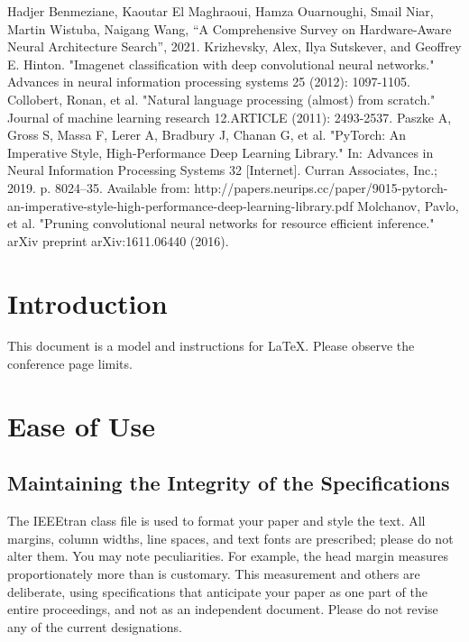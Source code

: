 \documentclass[conference]{IEEEtran}
\begin{document}
\begin{thebibliography}{00}
 Hadjer Benmeziane, Kaoutar El Maghraoui, Hamza Ouarnoughi, Smail Niar, Martin Wistuba, Naigang Wang, ``A Comprehensive Survey on Hardware-Aware Neural Architecture Search'', 2021.
 Krizhevsky, Alex, Ilya Sutskever, and Geoffrey E. Hinton. "Imagenet classification with deep convolutional neural networks." Advances in neural information processing systems 25 (2012): 1097-1105.
 Collobert, Ronan, et al. "Natural language processing (almost) from scratch." Journal of machine learning research 12.ARTICLE (2011): 2493-2537.
 Paszke A, Gross S, Massa F, Lerer A, Bradbury J, Chanan G, et al. "PyTorch: An Imperative Style, High-Performance Deep Learning Library." In: Advances in Neural Information Processing Systems 32 [Internet]. Curran Associates, Inc.; 2019. p. 8024–35. Available from: http://papers.neurips.cc/paper/9015-pytorch-an-imperative-style-high-performance-deep-learning-library.pdf
 Molchanov, Pavlo, et al. "Pruning convolutional neural networks for resource efficient inference." arXiv preprint arXiv:1611.06440 (2016).
\end{thebibliography}


\clearpage

\section{Introduction}
This document is a model and instructions for \LaTeX.
Please observe the conference page limits. 

\section{Ease of Use}

\subsection{Maintaining the Integrity of the Specifications}

The IEEEtran class file is used to format your paper and style the text. All margins, 
column widths, line spaces, and text fonts are prescribed; please do not 
alter them. You may note peculiarities. For example, the head margin
measures proportionately more than is customary. This measurement 
and others are deliberate, using specifications that anticipate your paper 
as one part of the entire proceedings, and not as an independent document. 
Please do not revise any of the current designations.
\end{document}
